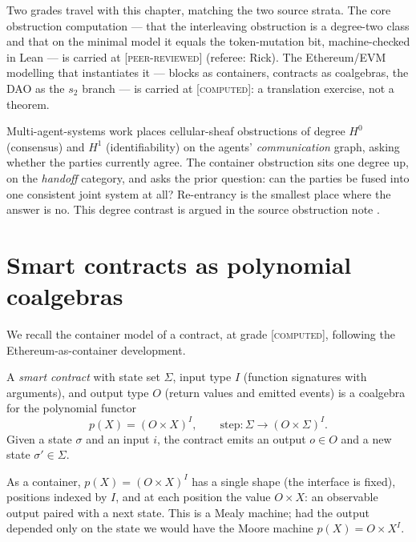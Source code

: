 Two grades travel with this chapter, matching the two source strata. The core
obstruction computation --- that the interleaving obstruction is a degree-two class and
that on the minimal model it equals the token-mutation bit, machine-checked in Lean ---
is carried at \textsc{[peer-reviewed]} (referee: Rick). The Ethereum/EVM modelling that
instantiates it --- blocks as containers, contracts as coalgebras, the DAO as the $s_2$
branch --- is carried at \textsc{[computed]}: a translation exercise, not a theorem.

\begin{remark}
Multi-agent-systems work places cellular-sheaf obstructions of degree $H^0$ (consensus)
and $H^1$ (identifiability) on the agents' \emph{communication} graph, asking whether the
parties currently agree. The container obstruction sits one degree up, on the
\emph{handoff} category, and asks the prior question: can the parties be fused into one
consistent joint system at all? Re-entrancy is the smallest place where the answer is
no. This degree contrast is argued in the source obstruction note \cite{cl-h2edges}.
\end{remark}

\section{Smart contracts as polynomial coalgebras}
\label{sec:blk-coalg}

We recall the container model of a contract, at grade \textsc{[computed]}, following the
Ethereum-as-container development.

\begin{definition}
A \emph{smart contract} with state set $\Sigma$, input type $I$ (function signatures
with arguments), and output type $O$ (return values and emitted events) is a coalgebra
for the polynomial functor
\[
  p(X)=(O\times X)^{I},
  \qquad
  \mathrm{step}\colon \Sigma \longrightarrow (O\times\Sigma)^{I}.
\]
Given a state $\sigma$ and an input $i$, the contract emits an output $o\in O$ and a new
state $\sigma'\in\Sigma$.
\end{definition}

As a container, $p(X)=(O\times X)^I$ has a single shape (the interface is fixed),
positions indexed by $I$, and at each position the value $O\times X$: an observable output
paired with a next state. This is a Mealy machine; had the output depended only on the
state we would have the Moore machine $p(X)=O\times X^I$.

